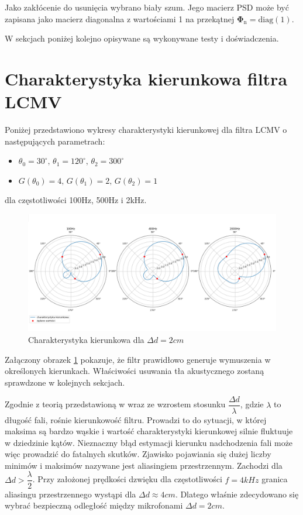 \noindent Jako zakłócenie do usunięcia wybrano biały szum. Jego macierz PSD może być zapisana jako macierz diagonalna z wartościami 1 na przekątnej $\bm{\Phi}_{\mathrm{n}} = \bm{\mathrm{diag}}(1)$.

\noindent W sekcjach poniżej kolejno opisywane są wykonywane testy i doświadczenia.

\section{Charakterystyka kierunkowa filtra LCMV}

Poniżej przedstawiono wykresy charakterystyki kierunkowej dla filtra LCMV o następujących parametrach:

\begin{itemize}
    \item $\theta_{0}=30^{\circ}, \,
    \theta_{1}=120^{\circ}, \,
    \theta_{2}=300^{\circ}$
    \item $G(\theta_{0})=4, \,
    G(\theta_{1})=2, \,
    G(\theta_{2})=1$
\end{itemize}
\noindent dla częstotliwości 100Hz, 500Hz i 2kHz.

\begin{figure}[h!]
    \centering
    \includegraphics[width=\textwidth]{Images/directivity0.02m.png}
    \caption{Charakterystyka kierunkowa dla $\Delta d = 2cm$}
    \label{fig:directivity0.02}
\end{figure}

\noindent Załączony obrazek \ref{fig:directivity0.02} pokazuje, że filtr prawidłowo generuje wymuszenia w określonych kierunkach. Właściwości usuwania tła akustycznego zostaną sprawdzone w kolejnych sekcjach.

\noindent Zgodnie z teorią przedstawioną w \cite{mccowan2001} wraz ze wzrostem stosunku $\dfrac{\Delta d}{\lambda}$, gdzie $\lambda$ to długość fali, rośnie kierunkowość filtru. Prowadzi to do sytuacji, w której maksima są bardzo wąskie i wartość charakterystyki kierunkowej silnie fluktuuje w dziedzinie kątów. Nieznaczny błąd estymacji kierunku nadchodzenia fali może więc prowadzić do fatalnych skutków. Zjawisko pojawiania się dużej liczby minimów i maksimów nazywane jest aliasingiem przestrzennym. Zachodzi dla $\Delta d > \dfrac{\lambda}{2}$. Przy założonej prędkości dzwięku dla częstotliwości $f = 4kHz$ granica aliasingu przestrzennego wystąpi dla $\Delta d \approx 4cm $. Dlatego właśnie zdecydowano się wybrać bezpieczną odległość między mikrofonami $\Delta d = 2cm$.

